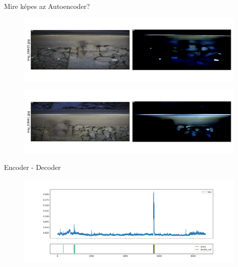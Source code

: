 \documentclass[aspectratio=169]{beamer}
\begin{document}
\begin{frame}{Mire képes az Autoencoder?}
    \begin{figure}
        \centering
        \includegraphics[width=\textwidth,trim={0 1cm 0 1cm},clip]{./results/vgg19_vgg19/20230510_172958_predict_0.png}
    \end{figure}
    \begin{figure}
        \centering
        \includegraphics[width=\textwidth,trim={0 1cm 0 1cm},clip]{./results/vgg19_bn_vgg19/20230525_045131_predict_0.png}
    \end{figure}
\end{frame}

\begin{frame}{Encoder - Decoder}
    \begin{figure}
        \centering
        \includegraphics[width=\textwidth,trim={0 0 0 1cm},clip]{./results/vgg19_vgg19/20230510_172958_feature_vectors_loss.png}
    \end{figure}
\end{frame}
\end{document}

